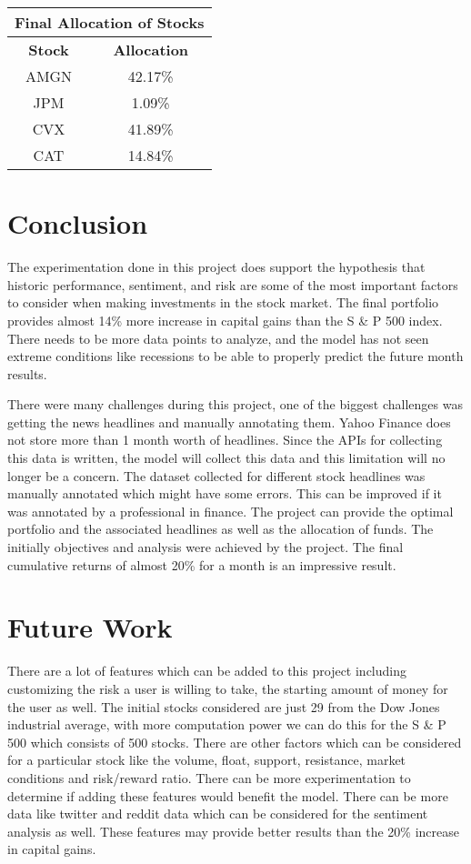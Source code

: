 \documentclass[12pt,a4paper, twoside]{article}
\begin{document}
\begin{multicols}{2}
\begin{center}
\begin{tabular}{ | c | c |  }
\hline
\multicolumn{2}{|c|}{\textbf{Final Allocation of Stocks}} \\
\hline
\textbf{Stock} & \textbf{Allocation} \\
\hline
AMGN & 42.17\% \\
JPM & 1.09\%\\
CVX & 41.89\% \\
CAT & 14.84\% \\
\hline
\end{tabular}
\end{center}
\section{Conclusion}
The experimentation done in this project does support the hypothesis that historic performance, sentiment, and risk are some of the most important factors to consider when making investments in the stock market. The final portfolio provides almost 14\% more increase in capital gains than the S \& P 500 index. There needs to be more data points to analyze, and the model has not seen extreme conditions like recessions to be able to properly predict the future month results.
 
There were many challenges during this project, one of the biggest challenges was getting the news headlines and manually annotating them. Yahoo Finance does not store more than 1 month worth of headlines. Since the APIs for collecting this data is written, the model will collect this data and this limitation will no longer be a concern. The dataset collected for different stock headlines was manually annotated which might have some errors. This can be improved if it was annotated by a professional in finance. The project can provide the optimal portfolio and the associated headlines as well as the allocation of funds. The initially objectives and analysis were achieved by the project. The final cumulative returns of almost 20\% for a month is an impressive result.
\section{Future Work}
There are a lot of features which can be added to this project including customizing the risk a user is willing to take, the starting amount of money for the user as well. The initial stocks considered are just 29 from the Dow Jones industrial average, with more computation power we can do this for the S \& P 500 which consists of 500 stocks. There are other factors which can be considered for a particular stock like the volume, float, support, resistance, market conditions and risk/reward ratio. There can be more experimentation to determine if adding these features would benefit the model. There can be more data like twitter and reddit data which can be considered for the sentiment analysis as well. These features may provide better results than the 20\% increase in capital gains.

\newpage
\end{multicols}
\end{document}

